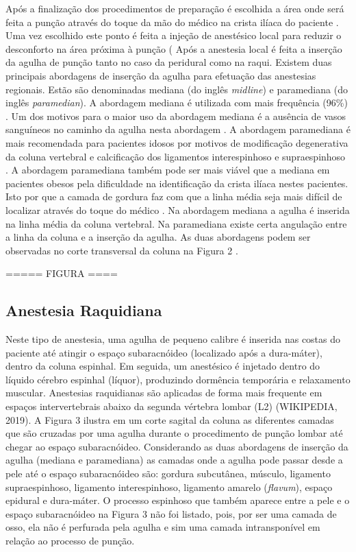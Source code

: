 Após a finalização dos procedimentos de preparação é escolhida a área onde será feita a punção através do toque da mão do médico na crista ilíaca do paciente \cite{Helayel2010,Isaacs2015}. Uma vez escolhido este ponto é feita a injeção de anestésico local para reduzir o desconforto na área próxima à punção (\cite{Sedicias2018} Após a anestesia local é feita a inserção da agulha de punção tanto no caso da peridural como na raqui.
Existem duas principais abordagens de inserção da agulha para efetuação das anestesias regionais. Estão são denominadas mediana (do inglês \textit{midline}) e paramediana (do inglês \textit{paramedian}). A abordagem mediana é utilizada com mais frequência (96\%) \cite{Wantman2006}. Um dos motivos para o maior uso da abordagem mediana é a ausência de vasos sanguíneos no caminho da agulha nesta abordagem \cite{Bapat2015}. A abordagem paramediana é mais recomendada para pacientes idosos \cite{Ahsan-ul-Haq2005} por motivos de modificação degenerativa da coluna vertebral \cite{Boon2003} e calcificação dos ligamentos interespinhoso e supraespinhoso \cite{Wantman2006}. A abordagem paramediana também pode ser mais viável que a mediana em pacientes obesos pela dificuldade na identificação da crista ilíaca nestes pacientes. Isto por que a camada de gordura faz com que a linha média seja mais difícil de localizar através do toque do médico \cite{N.2013}. Na abordagem mediana a agulha é inserida na linha média da coluna vertebral. Na paramediana existe certa angulação entre a linha da coluna e a inserção da agulha. As duas abordagens podem ser observadas no corte transversal da coluna na Figura 2 \cite{MedBroadcast2018}. 

===== FIGURA ====

\subsection{Anestesia Raquidiana}

Neste tipo de anestesia, uma agulha de pequeno calibre é inserida nas costas do paciente até atingir o espaço subaracnóideo (localizado após a dura-máter), dentro da coluna espinhal. Em seguida, um anestésico é injetado dentro do líquido cérebro espinhal (líquor), produzindo dormência temporária e relaxamento muscular. Anestesias raquidianas são aplicadas de forma mais frequente em espaços intervertebrais abaixo da segunda vértebra lombar (L2) (WIKIPEDIA, 2019). A Figura 3 ilustra em um corte sagital da coluna as diferentes camadas que são cruzadas por uma agulha durante o procedimento de punção lombar até chegar ao espaço subaracnóideo. Considerando as duas abordagens de inserção da agulha (mediana e paramediana) as camadas onde a agulha pode passar desde a pele até o espaço subaracnóideo são: gordura subcutânea, músculo, ligamento supraespinhoso, ligamento interespinhoso, ligamento amarelo (\textit{flavum}), espaço epidural e dura-máter. O processo espinhoso que também aparece entre a pele e o espaço subaracnóideo na Figura 3 não foi listado, pois, por ser uma camada de osso, ela não é perfurada pela agulha e sim uma camada intransponível em relação ao processo de punção.

